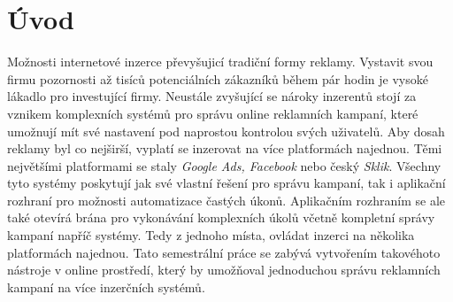 \chapter{Úvod}
\label{chap:introduction}
Možnosti internetové inzerce převyšujicí tradiční formy reklamy. Vystavit svou firmu pozornosti až tisíců potenciálních zákazníků během pár hodin je vysoké lákadlo pro investující firmy. Neustále zvyšující se nároky inzerentů stojí za vznikem komplexních systémů
pro správu online reklamních kampaní, které umožnují mít své nastavení pod naprostou kontrolou svých uživatelů. Aby dosah reklamy byl co nejširší, vyplatí se inzerovat na více platformách najednou. Těmi největšími platformami se staly
\emph{Google Ads, Facebook} nebo český \emph{Sklik}. Všechny tyto systémy poskytují jak své vlastní řešení pro správu kampaní, tak i aplikační rozhraní pro možnosti automatizace častých úkonů.
Aplikačním rozhraním se ale také otevírá brána pro vykonávání komplexních úkolů včetně kompletní správy kampaní napříč systémy. Tedy z jednoho místa, ovládat inzerci na několika platformách najednou.
Tato semestrální práce se zabývá vytvořením takovéhoto nástroje v online prostředí, který by umožňoval jednoduchou správu reklamních kampaní na více inzerčních systémů.

\endinput